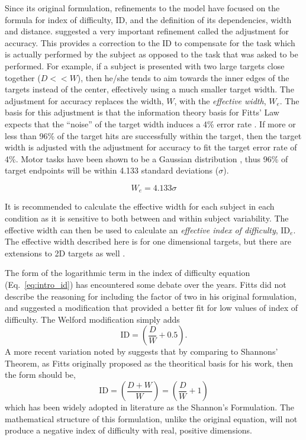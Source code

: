 Since its original formulation, refinements to the model have focused on the formula for index of difficulty, \(\text{ID}\), and the definition of its dependencies, width and distance.
\citet{crossman_speed_1957} suggested a very important refinement called the adjustment for accuracy.
This provides a correction to the \(\text{ID}\) to compensate for the task which is actually performed by the subject as opposed to the task that was asked to be performed.
For example, if a subject is presented with two large targets close together ($D << W$), then he/she tends to aim towards the inner edges of the targets instead of the center, effectively using a much smaller target width.
The adjustment for accuracy replaces the width, \(W\), with the \emph{effective width}, \(W_{e}\).
The basis for this adjustment is that the information theory basis for Fitts' Law expects that the ``noise'' of the target width induces a 4\% error rate \citep{mackenzie_fitts_1992}.
If more or less than 96\% of the target hits are successfully within the target, then the target width is adjusted with the adjustment for accuracy to fit the target error rate of 4\%.
Motor tasks have been shown to be a Gaussian distribution \citep{crossman_feedback_1983,woodworth_accuracy_1899}, thus 96\% of target endpoints will be within 4.133 standard deviations (\(\sigma\)).

\begin{equation}
W_{e} = 4.133\sigma
\end{equation}

It is recommended to calculate the effective width for each subject in each condition as it is sensitive to both between and within subject variability.
The effective width can then be used to calculate an \emph{effective index of difficulty}, \(\text{ID}_{e}\).
The effective width described here is for one dimensional targets, but there are extensions to 2D targets as well \citep{murata_extending_2001}.

The form of the logarithmic term in the index of difficulty equation (Eq.\ \ref{eq:intro_id}) has encountered some debate over the years.
Fitts did not describe the reasoning for including the factor of two in his original formulation, and \citet{welford_fundamentals_1968} suggested a modification that provided a better fit for low values of index of difficulty.
The Welford modification simply adds
\begin{equation}
    \mathrm{ID} = \left( \frac{D}{W} + 0.5 \right).
\end{equation}
A more recent variation noted by \citet{mackenzie_note_1989} suggests that by comparing to Shannons' Theorem, as Fitts originally proposed as the theoritical basis for his work, then the form should be,
\begin{equation}
    \mathrm{ID} = \left( \frac{D + W}{W} \right) = \left( \frac{D}{W} + 1 \right)
\end{equation}
which has been widely adopted in literature as the Shannon's Formulation.
The mathematical structure of this formulation, unlike the original equation, will not produce a negative index of difficulty with real, positive dimensions.


